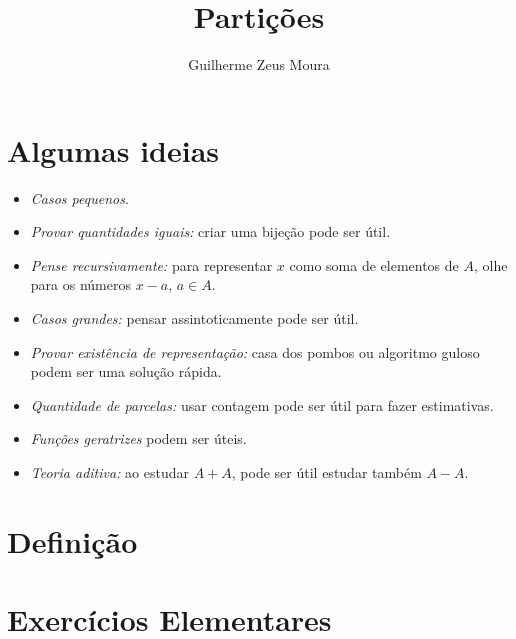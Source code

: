\documentclass[10pt, a4paper]{article}
\title{Partições}
\author{Guilherme Zeus Moura}
\begin{document}
	
	\zeustitle

	\nocite{PartitionsofIntegers-JLaurendi}
	\nocite{Particoes-CShine}
	\nocite{Particoes-GLucas}
	\nocite{NT-DSantos}
	\nocite{Combinatorics3-YZhao}

	\section*{Algumas ideias}

	\begin{itemize}
		\item \emph{Casos pequenos}.
		\item \emph{Provar quantidades iguais:} criar uma bijeção pode ser útil.
		\item \emph{Pense recursivamente:} para representar $x$ como soma de elementos de $A$, olhe para os números $x - a$, $a \in A$.
		\item \emph{Casos grandes:} pensar assintoticamente pode ser útil.
		\item \emph{Provar existência de representação:} casa dos pombos ou algoritmo guloso podem ser uma solução rápida.
		\item \emph{Quantidade de parcelas:} usar contagem pode ser útil para fazer estimativas.
		\item \emph{Funções geratrizes} podem ser úteis.
		\item \emph{Teoria aditiva:} ao estudar $A + A$, pode ser útil estudar também $A - A$. 
	\end{itemize}

	\section*{Definição}


	\newpage

	\section{Exercícios Elementares}
\end{document}
